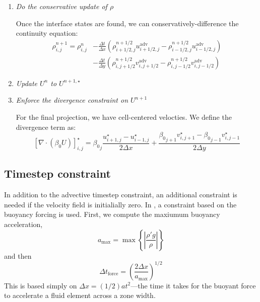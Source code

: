\begin{enumerate}
  
\item {\em Do the conservative update of $\rho$}

  Once the interface states are found, we can conservatively-difference
the continuity equation:
\begin{align}
\rho^{n+1}_{i,j} = \rho^n_{i,j} 
   &- \frac{\Delta t}{\Delta x} 
      \left (\rho_{i+1/2,j}^{n+1/2} u^\mathrm{adv}_{i+1/2,j} -
             \rho_{i-1/2,j}^{n+1/2} u^\mathrm{adv}_{i-1/2,j} \right ) \nonumber \\
   &- \frac{\Delta t}{\Delta y}
      \left (\rho_{i,j+1/2}^{n+1/2} v^\mathrm{adv}_{i,j+1/2} -
             \rho_{i,j-1/2}^{n+1/2} v^\mathrm{adv}_{i,j-1/2} \right )
\end{align}


\item {\em Update $U^n$ to $U^{n+1,\star}$}
  
\item {\em Enforce the divergence constraint on $U^{n+1}$}

  For the final projection, we have cell-centered velocties.  We 
  define the divergence term as:
  \begin{equation}
    \left [ \nabla \cdot (\beta_0 U) \right ]_{i,j}^\star =
          {\beta_0}_j \frac{u^\star_{i+1,j} - 
            u^\star_{i-1,j}}{2\Delta x} +
          \frac{{\beta_0}_{j+1} v^\star_{i,j+1} - 
            {\beta_0}_{j-1} v^\star_{i,j-1} }{2\Delta y}
  \end{equation}

  
\end{enumerate}


\subsection{Timestep constraint}

In addition to the advective timestep constraint, an additional constraint
is needed if the velocity field is initialially zero.  In \cite{ABNZ:III},
a constraint based on the buoyancy forcing is used.  First, we compute
the maxiumum buoyancy acceleration,
\begin{equation}
a_\mathrm{max} = \max \left \{ \left |\frac{\rho'g}{\rho} \right | \right \}
\end{equation}
and then 
\begin{equation}
\Delta t_\mathrm{force} = \left ( \frac{2 \Delta x}{a_\mathrm{max}} \right )^{1/2} 
\end{equation}
This is based simply on $\Delta x = (1/2) a t^2$---the
time it takes for the buoyant force to accelerate a fluid element
across a zone width.


